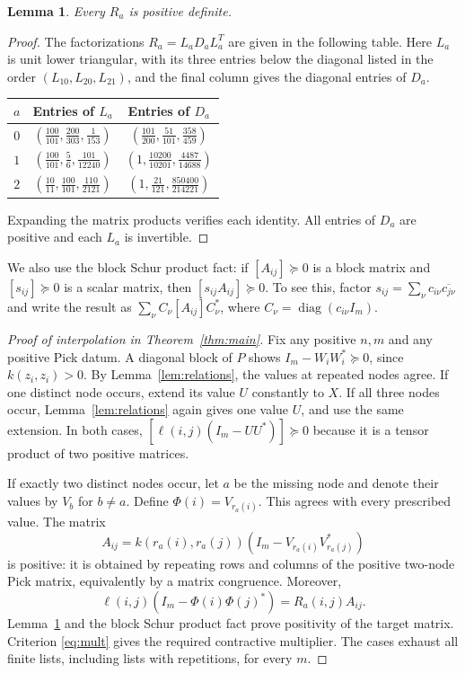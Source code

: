 \documentclass[11pt]{article}
\newtheorem{lemma}[theorem]{Lemma}
\newcommand{\psd}{\succeq0}
\newcommand{\diag}{\operatorname{diag}}
\begin{document}
\begin{lemma}\label{lem:retract}
Every $R_a$ is positive definite.
\end{lemma}
\begin{proof}
The factorizations $R_a=L_aD_aL_a^T$ are given in the following table.
Here $L_a$ is unit lower triangular, with its three entries below the
diagonal listed in the order $(L_{10},L_{20},L_{21})$, and the final
column gives the diagonal entries of $D_a$.
\begin{center}
\renewcommand{\arraystretch}{1.65}
\begin{tabular}{c c c}
\toprule
$a$ & Entries of $L_a$ & Entries of $D_a$\\
\midrule
$0$ & $\left(\frac{100}{101},\frac{200}{303},\frac{1}{153}\right)$
    & $\left(\frac{101}{200},\frac{51}{101},\frac{358}{459}\right)$\\
$1$ & $\left(\frac{100}{101},\frac56,\frac{101}{12240}\right)$
    & $\left(1,\frac{10200}{10201},\frac{4487}{14688}\right)$\\
$2$ & $\left(\frac{10}{11},\frac{100}{101},\frac{110}{2121}\right)$
    & $\left(1,\frac{21}{121},\frac{850400}{214221}\right)$\\
\bottomrule
\end{tabular}
\end{center}
Expanding the matrix products verifies each identity. All entries of $D_a$
are positive and each $L_a$ is invertible.
\end{proof}

We also use the block Schur product fact: if $[A_{ij}]\psd$ is a block
matrix and $[s_{ij}]\psd$ is a scalar matrix, then
$[s_{ij}A_{ij}]\psd$. To see this, factor
$s_{ij}=\sum_\nu c_{i\nu}\overline{c_{j\nu}}$ and write the result as
$\sum_\nu C_\nu[A_{ij}]C_\nu^*$, where
$C_\nu=\diag(c_{i\nu}I_m)$.

\begin{proof}[Proof of interpolation in Theorem~\ref{thm:main}]
Fix any positive $n,m$ and any positive Pick datum. A diagonal block of
$P$ shows $I_m-W_iW_i^*\psd$, since $k(z_i,z_i)>0$.
By Lemma~\ref{lem:relations}, the values at repeated nodes agree.
If one distinct node occurs, extend its value $U$ constantly to $X$.
If all three nodes occur, Lemma~\ref{lem:relations} again gives one
value $U$, and use the same extension. In both cases,
$[\ell(i,j)(I_m-UU^*)]\psd$ because it is a tensor product of two
positive matrices.

If exactly two distinct nodes occur, let $a$ be the missing node and
denote their values by $V_b$ for $b\ne a$. Define
$\Phi(i)=V_{r_a(i)}$. This agrees with every prescribed value. The
matrix
\[
 A_{ij}=k(r_a(i),r_a(j))
       (I_m-V_{r_a(i)}V_{r_a(j)}^*)
\]
is positive: it is obtained by repeating rows and columns of the positive
two-node Pick matrix, equivalently by a matrix congruence. Moreover,
\[
 \ell(i,j)(I_m-\Phi(i)\Phi(j)^*)=R_a(i,j)A_{ij}.
\]
Lemma~\ref{lem:retract} and the block Schur product fact prove positivity
of the target matrix. Criterion \eqref{eq:mult} gives the required
contractive multiplier. The cases exhaust all finite lists, including
lists with repetitions, for every $m$.
\end{proof}
\end{document}
